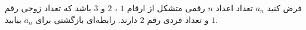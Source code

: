     \p 
فرض کنید
$a_n$
تعداد اعداد
$n$
رقمی متشکل از ارقام
$1$
،
$2$
و
$3$
باشد که تعداد زوجی رقم
$1$
و تعداد فردی رقم
$2$
دارند. رابطه‌ای بازگشتی برای
$a_n$
بیابید.